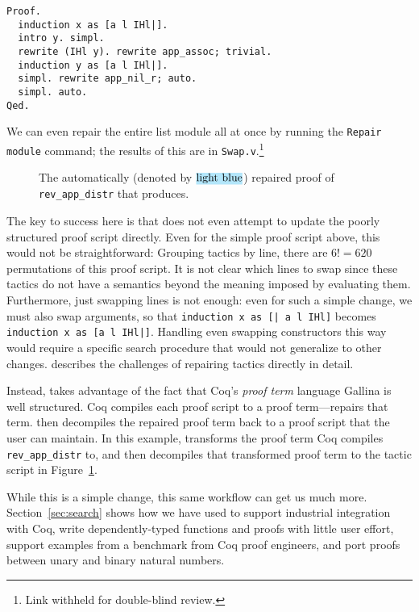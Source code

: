\begin{lstlisting}
Proof.
  induction x as [a l IHl|].
  intro y. simpl.
  rewrite (IHl y). rewrite app_assoc; trivial.
  induction y as [a l IHl|].
  simpl. rewrite app_nil_r; auto.
  simpl. auto.
Qed.
\end{lstlisting}
We can even repair the entire list module all at once by running the \lstinline{Repair module}
command; the results of this are in \lstinline{Swap.v}.\footnote{Link withheld for double-blind review.} %

\begin{figure}
\codeauto{}
\caption{The automatically (denoted by $\codeauto{light blue}$) repaired proof of \lstinline{rev_app_distr} that \toolname produces.}
\label{fig:auto}
\end{figure}

The key to success here is that \toolname does not even attempt to update the poorly structured proof script directly.
Even for the simple proof script above, this would not be straightforward: Grouping tactics by line, there are $6! = 620$
permutations of this proof script.
It is not clear which lines to swap since these tactics do not have a semantics beyond the meaning imposed by evaluating them.
Furthermore, just swapping lines is not enough: even for such a simple change, we must also swap
arguments, so that \lstinline{induction x as [| a l IHl]} becomes \lstinline{induction x as [a l IHl|]}.
Handling even swapping constructors this way would require a specific search procedure that would not generalize to other changes.
\citet{robert2018} describes the challenges of repairing tactics directly in detail.

Instead, \toolname takes advantage of the fact that Coq's \textit{proof term} language Gallina is well structured.
Coq compiles each proof script to a proof term---\toolname repairs that term.
\toolname then decompiles the repaired proof term back to a proof script that the user can maintain.
In this example, \toolname transforms the proof term Coq compiles \lstinline{rev_app_distr} to,
and then decompiles that transformed proof term to the tactic script in Figure~\ref{fig:auto}.

While this is a simple change, this same workflow can get us much more.
Section~\ref{sec:search} shows how we have used \toolname to support industrial integration with Coq,
write dependently-typed functions and proofs with little user effort,
support examples from a benchmark from Coq proof engineers,
and port proofs between unary and binary natural numbers.




